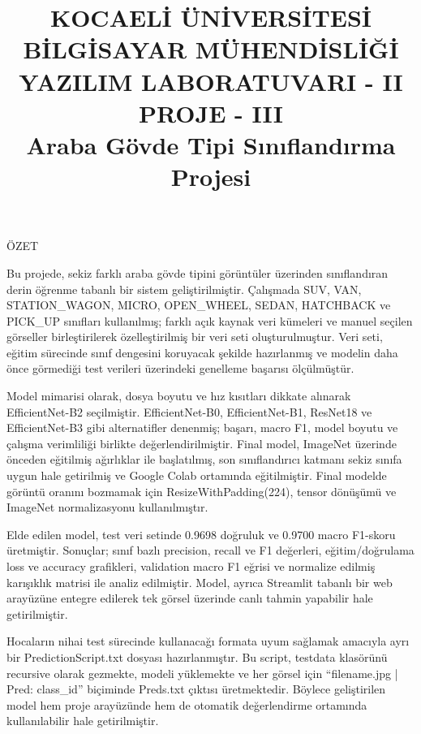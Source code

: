 \documentclass[conference]{IEEEtran}
\title{%
	\normalsize\bfseries
	KOCAELİ ÜNİVERSİTESİ BİLGİSAYAR MÜHENDİSLİĞİ\\[1em]
	YAZILIM LABORATUVARI - II\\
	PROJE - III\\[1em]
	Araba Gövde Tipi Sınıflandırma Projesi
}
\author{
	\IEEEauthorblockN{Saffet Hakan KOÇAK}
	\IEEEauthorblockA{%
		Bilgisayar Mühendisliği\\
		Kocaeli Üniversitesi\\
		230202058%
	}
	\and
	\IEEEauthorblockN{Yusuf BÜLBÜL}
	\IEEEauthorblockA{%
		Bilgisayar Mühendisliği\\
		Kocaeli Üniversitesi\\
		230202050%
	}
}
\renewenvironment{abstract}{%
	\par\noindent
	{\normalfont\normalsize ÖZET}\par\medskip
	\normalfont\normalsize
}{%
	\par
}
\begin{document}
\maketitle

\begin{abstract}
Bu projede, sekiz farklı araba gövde tipini görüntüler üzerinden
sınıflandıran derin öğrenme tabanlı bir sistem geliştirilmiştir. Çalışmada
SUV, VAN, STATION\_WAGON, MICRO, OPEN\_WHEEL, SEDAN, HATCHBACK ve PICK\_UP
sınıfları kullanılmış; farklı açık kaynak veri kümeleri ve manuel seçilen
görseller birleştirilerek özelleştirilmiş bir veri seti oluşturulmuştur.
Veri seti, eğitim sürecinde sınıf dengesini koruyacak şekilde
hazırlanmış ve modelin daha önce görmediği test verileri üzerindeki
genelleme başarısı ölçülmüştür.
\vspace{0.4cm}

Model mimarisi olarak, dosya boyutu ve hız kısıtları dikkate alınarak
EfficientNet-B2 seçilmiştir. EfficientNet-B0, EfficientNet-B1, ResNet18 ve
EfficientNet-B3 gibi alternatifler denenmiş; başarı, macro F1, model boyutu
ve çalışma verimliliği birlikte değerlendirilmiştir. Final model, ImageNet
üzerinde önceden eğitilmiş ağırlıklar ile başlatılmış, son sınıflandırıcı
katmanı sekiz sınıfa uygun hale getirilmiş ve Google Colab ortamında
eğitilmiştir. Final modelde görüntü oranını bozmamak için
ResizeWithPadding(224), tensor dönüşümü ve ImageNet normalizasyonu
kullanılmıştır.
\vspace{0.4cm}

Elde edilen model, test veri setinde 0.9698 doğruluk ve 0.9700 macro
F1-skoru üretmiştir. Sonuçlar; sınıf bazlı precision, recall ve F1
değerleri, eğitim/doğrulama loss ve accuracy grafikleri, validation macro
F1 eğrisi ve normalize edilmiş karışıklık matrisi ile analiz edilmiştir.
Model, ayrıca Streamlit tabanlı bir web arayüzüne entegre edilerek tek
görsel üzerinde canlı tahmin yapabilir hale getirilmiştir.
\vspace{0.4cm}

Hocaların nihai test sürecinde kullanacağı formata uyum sağlamak amacıyla
ayrı bir PredictionScript.txt dosyası hazırlanmıştır. Bu script,
testdata klasörünü recursive olarak gezmekte, modeli yüklemekte ve her
görsel için ``filename.jpg | Pred: class\_id'' biçiminde Preds.txt çıktısı
üretmektedir. Böylece geliştirilen model hem proje arayüzünde hem de
otomatik değerlendirme ortamında kullanılabilir hale getirilmiştir.
\vspace{0.4cm}
\end{abstract}
\end{document}
